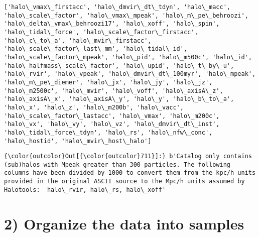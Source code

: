 \documentclass[11pt]{article}
\begin{document}
    \begin{Verbatim}[commandchars=\\\{\}]
['halo\_vmax\_firstacc', 'halo\_dmvir\_dt\_tdyn', 'halo\_macc', 'halo\_scale\_factor', 'halo\_vmax\_mpeak', 'halo\_m\_pe\_behroozi', 'halo\_delta\_vmax\_behroozi17', 'halo\_xoff', 'halo\_spin', 'halo\_tidal\_force', 'halo\_scale\_factor\_firstacc', 'halo\_c\_to\_a', 'halo\_mvir\_firstacc', 'halo\_scale\_factor\_last\_mm', 'halo\_tidal\_id', 'halo\_scale\_factor\_mpeak', 'halo\_pid', 'halo\_m500c', 'halo\_id', 'halo\_halfmass\_scale\_factor', 'halo\_upid', 'halo\_t\_by\_u', 'halo\_rvir', 'halo\_vpeak', 'halo\_dmvir\_dt\_100myr', 'halo\_mpeak', 'halo\_m\_pe\_diemer', 'halo\_jx', 'halo\_jy', 'halo\_jz', 'halo\_m2500c', 'halo\_mvir', 'halo\_voff', 'halo\_axisA\_z', 'halo\_axisA\_x', 'halo\_axisA\_y', 'halo\_y', 'halo\_b\_to\_a', 'halo\_x', 'halo\_z', 'halo\_m200b', 'halo\_vacc', 'halo\_scale\_factor\_lastacc', 'halo\_vmax', 'halo\_m200c', 'halo\_vx', 'halo\_vy', 'halo\_vz', 'halo\_dmvir\_dt\_inst', 'halo\_tidal\_force\_tdyn', 'halo\_rs', 'halo\_nfw\_conc', 'halo\_hostid', 'halo\_mvir\_host\_halo']

    \end{Verbatim}

\begin{Verbatim}[commandchars=\\\{\}]
{\color{outcolor}Out[{\color{outcolor}711}]:} b'Catalog only contains (sub)halos with Mpeak greater than 300 particles. The following columns have been divided by 1000 to convert them from the kpc/h units provided in the original ASCII source to the Mpc/h units assumed by Halotools:  halo\_rvir, halo\_rs, halo\_xoff'
\end{Verbatim}
            
    \section{2) Organize the data into
samples}\label{organize-the-data-into-samples}
\end{document}
